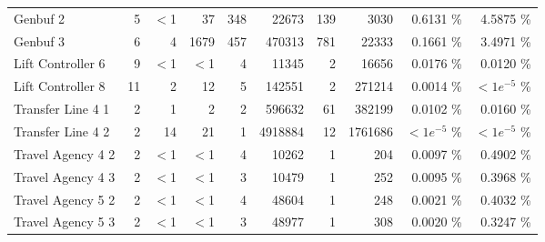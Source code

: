 \begin{tabular}{|l|r|rrr|rrr|rr|}
  Genbuf 2 &   5 & $<$1 & 37 & 348 & 22673 & 139 & 3030 &  0.6131 \% &    4.5875 \% \\ 
  Genbuf 3 &   6 & 4 & 1679 & 457 & 470313 & 781 & 22333 &  0.1661 \% &    3.4971 \% \\ 
  Lift Controller 6 &   9 & $<$1 & $<$1 & 4 & 11345 & 2 & 16656 &  0.0176 \% &    0.0120 \% \\ 
  Lift Controller 8 &  11 & 2 & 12 & 5 & 142551 & 2 & 271214 &  0.0014 \% & $<1e^{-5}$ \% \\ 
  Transfer Line 4 1 &   2 & 1 & 2 & 2 & 596632 & 61 & 382199 &  0.0102 \% &    0.0160 \% \\ 
  Transfer Line 4 2 &   2 & 14 & 21 & 1 & 4918884 & 12 & 1761686 & $<1e^{-5}$ \% & $<1e^{-5}$ \% \\ 
  Travel Agency 4 2 &   2 & $<$1 & $<$1 & 4 & 10262 & 1 & 204 &  0.0097 \% &    0.4902 \% \\ 
  Travel Agency 4 3 &   2 & $<$1 & $<$1 & 3 & 10479 & 1 & 252 &  0.0095 \% &    0.3968 \% \\ 
  Travel Agency 5 2 &   2 & $<$1 & $<$1 & 4 & 48604 & 1 & 248 &  0.0021 \% &    0.4032 \% \\ 
  Travel Agency 5 3 &   2 & $<$1 & $<$1 & 3 & 48977 & 1 & 308 &  0.0020 \% &    0.3247 \% \\ 
   \hline
\end{tabular}
